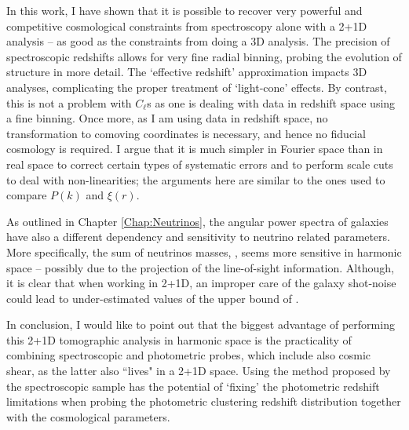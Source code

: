 \qquad In this work, I have shown that it is possible to recover very powerful and competitive cosmological constraints from spectroscopy alone with a 2+1D analysis -- as good as the constraints from doing a 3D analysis. The precision of spectroscopic redshifts allows for very fine radial binning, probing the evolution of structure in more detail. The `effective redshift' approximation impacts 3D analyses, complicating the proper treatment of `light-cone' effects. By contrast, this is not a problem with $C_{\ell}$s as one is dealing with data in redshift space using a fine binning. Once more, as I am using data in redshift space, no transformation to comoving coordinates is necessary, and hence no fiducial cosmology is required. I argue that it is much simpler in Fourier space than in real space to correct certain types of systematic errors and to perform scale cuts to deal with non-linearities; the arguments here are similar to the ones used to compare $P(k)$ and $\xi(r)$.

\qquad As outlined in Chapter \ref{Chap:Neutrinos}, the angular power spectra of galaxies have also a different dependency and sensitivity to neutrino related parameters. More specifically, the sum of neutrinos masses, \NM, seems more sensitive in harmonic space -- possibly due to the projection of the line-of-sight information. Although, it is clear that when working in 2+1D, an improper care of the galaxy shot-noise could lead to under-estimated values of the upper bound of \NM.

\qquad In conclusion, I would like to point out that the biggest advantage of performing this 2+1D tomographic analysis in harmonic space is the practicality of combining spectroscopic and photometric probes, which include also cosmic shear, as the latter also ``lives" in a 2+1D space. Using the method proposed by \cite{2016McLeod} the spectroscopic sample has the potential of `fixing' the photometric redshift limitations when probing the photometric clustering redshift distribution together with the cosmological parameters.


